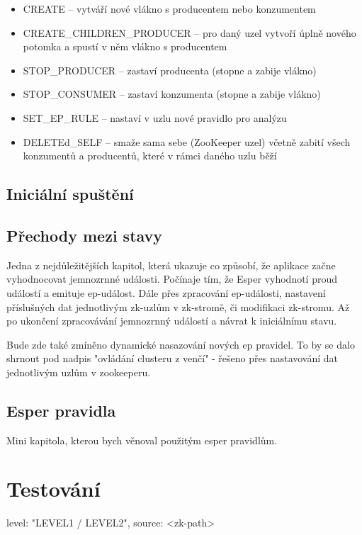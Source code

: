 \documentclass[
  digital, %
  table,   %
  nolof,     %
  nolot,     %
  twoside, %
  nocover,
  monochrome,
  12pt
]{fithesis3}
\begin{document}
\begin{itemize}
  \item CREATE -- vytváří nové vlákno s producentem nebo konzumentem
  \item CREATE\_CHILDREN\_PRODUCER -- pro daný uzel vytvoří úplně nového potomka a spustí v něm vlákno s producentem
  \item STOP\_PRODUCER -- zastaví producenta (stopne a zabije vlákno)
  \item STOP\_CONSUMER -- zastaví konzumenta (stopne a zabije vlákno)
  \item SET\_EP\_RULE -- nastaví v uzlu nové pravidlo pro analýzu
  \item DELETEd\_SELF -- smaže sama sebe (ZooKeeper uzel) včetně zabití všech konzumentů a producentů, které v rámci daného uzlu běží
\end{itemize}

\subsection{Iniciální spuštění}
\subsection{Přechody mezi stavy}
Jedna z nejdůležitějších kapitol, která ukazuje co způsobí, že aplikace začne vyhodnocovat jemnozrnné události. Počínaje tím, že Esper vyhodnotí proud událostí a emituje ep-událost. Dále přes zpracování ep-události, nastavení příslušných dat jednotlivým zk-uzlům v zk-stromě, či modifikaci zk-stromu. Až po ukončení zpracovávání jemnozrnný událostí a návrat k iniciálnímu stavu.

Bude zde také zmíněno dynamické nasazování nových ep pravidel. To by se dalo shrnout pod nadpis "ovládání clusteru z venčí" - řešeno přes nastavování dat jednotlivým uzlům v zookeeperu.

\subsection{Esper pravidla}
Mini kapitola, kterou bych věnoval použitým esper pravidlům.
\section{Testování}

\begin{center}
\begin{minipage}[H]{.6\linewidth}
	\begin{mylisting}
	{
		level: "LEVEL1 / LEVEL2",
		source: <zk-path>
	}
	\end{mylisting}
	\label{fig:data-example-1} 
\end{minipage}
\end{center}
\end{document}
